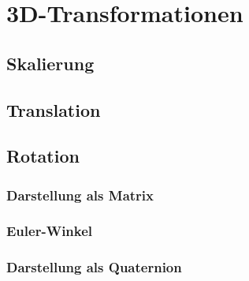\chapter{3D-Transformationen}

\section{Skalierung}

\section{Translation}

\section{Rotation}
\subsection{Darstellung als Matrix}
\subsection{Euler-Winkel}
\subsection{Darstellung als Quaternion}